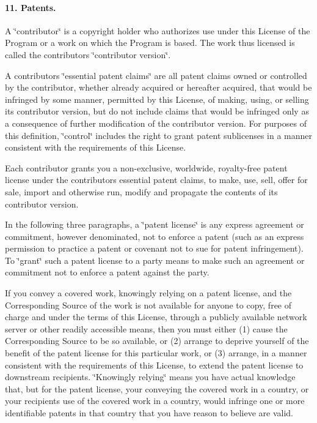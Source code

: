 \paragraph*{11. Patents.}

A \char`\"{}contributor\char`\"{} is a copyright holder who authorizes use under this License of the Program or a work on which the Program is based. The work thus licensed is called the contributor\textquotesingle{}s \char`\"{}contributor version\char`\"{}.

A contributor\textquotesingle{}s \char`\"{}essential patent claims\char`\"{} are all patent claims owned or controlled by the contributor, whether already acquired or hereafter acquired, that would be infringed by some manner, permitted by this License, of making, using, or selling its contributor version, but do not include claims that would be infringed only as a consequence of further modification of the contributor version. For purposes of this definition, \char`\"{}control\char`\"{} includes the right to grant patent sublicenses in a manner consistent with the requirements of this License.

Each contributor grants you a non-\/exclusive, worldwide, royalty-\/free patent license under the contributor\textquotesingle{}s essential patent claims, to make, use, sell, offer for sale, import and otherwise run, modify and propagate the contents of its contributor version.

In the following three paragraphs, a \char`\"{}patent license\char`\"{} is any express agreement or commitment, however denominated, not to enforce a patent (such as an express permission to practice a patent or covenant not to sue for patent infringement). To \char`\"{}grant\char`\"{} such a patent license to a party means to make such an agreement or commitment not to enforce a patent against the party.

If you convey a covered work, knowingly relying on a patent license, and the Corresponding Source of the work is not available for anyone to copy, free of charge and under the terms of this License, through a publicly available network server or other readily accessible means, then you must either (1) cause the Corresponding Source to be so available, or (2) arrange to deprive yourself of the benefit of the patent license for this particular work, or (3) arrange, in a manner consistent with the requirements of this License, to extend the patent license to downstream recipients. \char`\"{}\+Knowingly relying\char`\"{} means you have actual knowledge that, but for the patent license, your conveying the covered work in a country, or your recipient\textquotesingle{}s use of the covered work in a country, would infringe one or more identifiable patents in that country that you have reason to believe are valid.

